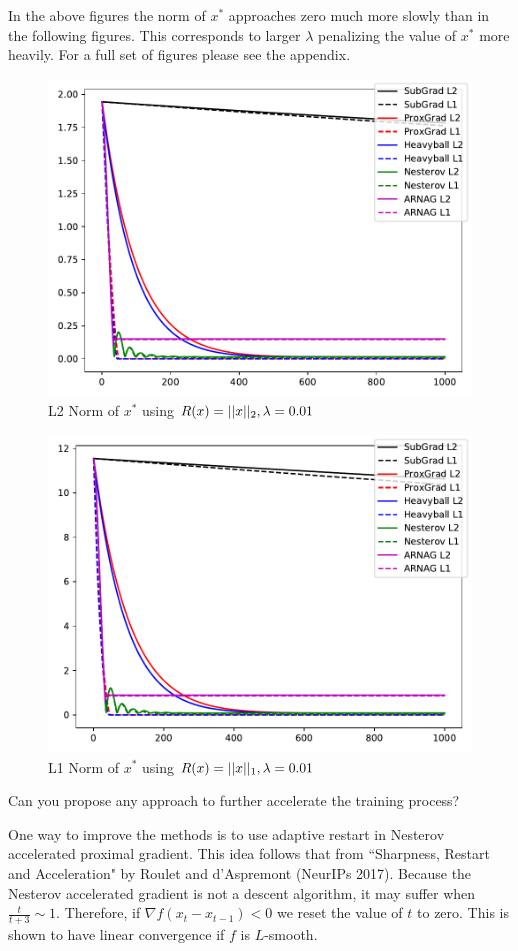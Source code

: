 \documentclass[11pt, answers]{exam}
\begin{document}
\begin{questions}
\begin{solution}
		In the above figures the norm of $x^*$ approaches zero much more slowly than in the following figures.
		This corresponds to larger $\lambda$ penalizing the value of $x^*$ more heavily.
		For a full set of figures please see the appendix.
		\begin{figure}[H]
		\centering
		\includegraphics[width=.75\textwidth]{../out/01xl2.pdf}
		\caption{L2 Norm of $x^*$ using $R(x)=|| x ||_2,\lambda=0.01$}
		\end{figure}
		\begin{figure}[H]
		\centering
		\includegraphics[width=.75\textwidth]{../out/01xl1.pdf}
		\caption{L1 Norm of $x^*$ using $R(x)=|| x ||_1,\lambda=0.01$}
		\end{figure}
	\end{solution}
	
	\pagebreak

	\question Can you propose any approach to further accelerate the training process?
	
	\begin{solution}
	
	One way to improve the methods is to use adaptive restart in Nesterov accelerated proximal gradient. This idea follows that from ``Sharpness, Restart and Acceleration" by Roulet and d'Aspremont (NeurIPs 2017). Because the Nesterov accelerated gradient is not a descent algorithm, it may suffer when $\frac{t}{t+3}\sim 1$. Therefore, if $\nabla f (x_t-x_{t-1})<0$ we reset the value of $t$ to zero. This is shown to have linear convergence if $f$ is $L$-smooth.
	

\end{solution}
\end{questions}
\end{document}
